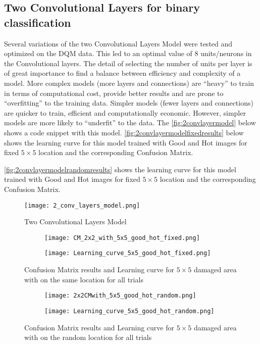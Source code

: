 \subsection{Two Convolutional Layers for binary classification\label{sect:2convlayermodel}}
Several variations of the two Convolutional Layers Model were tested and optimized on the DQM data. This led to an optimal value of 8 units/neurons in the Convolutional layers. 
The detail of selecting the number of units per layer is of great importance to find a balance between efficiency and complexity of a model. More complex models (more layers and connections) are “heavy” to train in terms of computational cost, provide better results and are prone to “overfitting” to the training data.
 Simpler models (fewer layers and connections) are quicker to train, efficient and computationally economic. However, simpler models are more likely to “underfit” to the data. The \autoref{fig:2convlayermodel} below shows a code snippet with this model.
\autoref{fig:2convlayermodelfixedresults} below shows the learning curve for this model trained with Good and Hot images for fixed $5\times 5$ location and the corresponding Confusion Matrix.

\autoref{fig:2convlayermodelrandomresults} shows the learning curve for this model trained with Good and Hot images for fixed $5\times5$  location and the corresponding Confusion Matrix.

\begin{figure}
\begin{center}
    \texttt{[image: 2\_conv\_layers\_model.png]}
\end{center}
\caption{Two Convolutional Layers Model\label{fig:2convlayermodel}}
\end{figure}


\begin{figure}
\centering
	\begin{subfigure}{.45\textwidth}
 	\texttt{[image: CM\_2x2\_with\_5x5\_good\_hot\_fixed.png]}
	\end{subfigure}
	\begin{subfigure}{.45\textwidth}
	\texttt{[image: Learning\_curve\_5x5\_good\_hot\_fixed.png]}
	\end{subfigure}
	\caption{Confusion Matrix results and Learning curve
	 for $5\times 5$ damaged area with on the same location for all trials\label{fig:2convlayermodelfixedresults}}
 \end{figure}
 
 \begin{figure}
 	\begin{subfigure}{.45\textwidth}
 		\texttt{[image: 2x2CMwith\_5x5\_good\_hot\_random.png]}
 	\end{subfigure}
 	\begin{subfigure}{.45\textwidth}
 	\texttt{[image: Learning\_curve\_5x5\_good\_hot\_random.png]}
 	\end{subfigure}
 \caption{Confusion Matrix results and Learning curve
	 for $5\times5$ damaged area with on the random location for all trials\label{fig:2convlayermodelrandomresults}}
 \end{figure}
 

